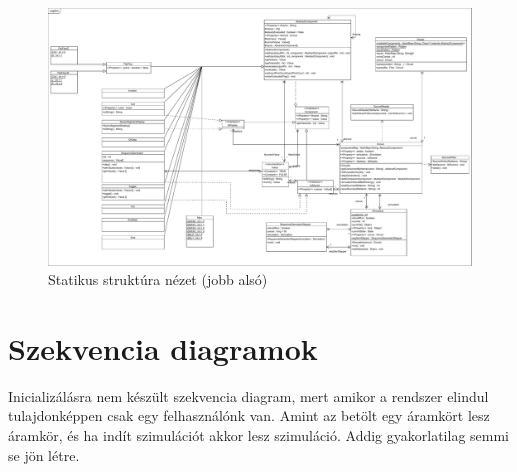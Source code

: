 \begin{figure}[H]
\begin{center}
\includegraphics*[angle=90, width=14cm, viewport = 765 0 1530 475]{chapters/chapter03/classdiagram/class_diagram.pdf}
\caption{Statikus struktúra nézet (jobb alsó)}
\label{fig:class_diagram}
\end{center}
\end{figure}

\section{Szekvencia diagramok}
Inicializálásra nem készült szekvencia diagram, mert amikor a rendszer elindul tulajdonképpen csak egy felhasználónk van. Amint az betölt egy áramkört lesz áramkör, és ha indít szimulációt akkor lesz szimuláció. Addig gyakorlatilag semmi se jön létre.

